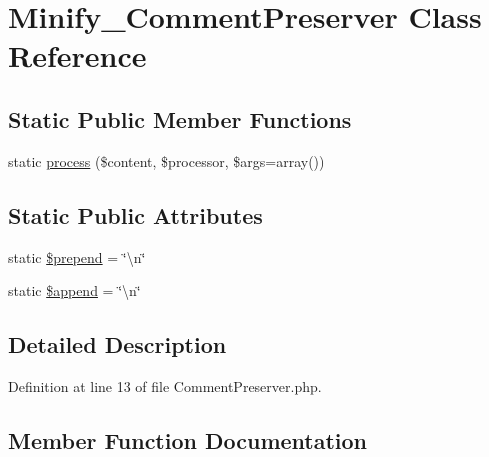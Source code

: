 \hypertarget{class_minify___comment_preserver}{}\section{Minify\+\_\+\+Comment\+Preserver Class Reference}
\label{class_minify___comment_preserver}
\subsection*{Static Public Member Functions}
\begin{DoxyCompactItemize}
\item 
static \hyperlink{class_minify___comment_preserver_a0effb03f48e0b63fc75462dc9383db55}{process} (\$content, \$processor, \$args=array())
\end{DoxyCompactItemize}
\subsection*{Static Public Attributes}
\begin{DoxyCompactItemize}
\item 
static \hyperlink{class_minify___comment_preserver_a829d62e7dd18027c1fc2c9b3fe321ae2}{\$prepend} = \char`\"{}\textbackslash{}n\char`\"{}
\item 
static \hyperlink{class_minify___comment_preserver_a0363de7e77115bb52718abdab127e971}{\$append} = \char`\"{}\textbackslash{}n\char`\"{}
\end{DoxyCompactItemize}


\subsection{Detailed Description}


Definition at line 13 of file Comment\+Preserver.\+php.



\subsection{Member Function Documentation}
